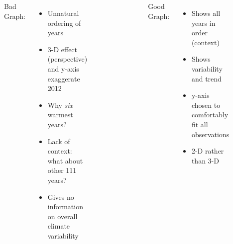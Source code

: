 \documentclass{beamer}
\begin{document}
\begin{frame}
\begin{columns}
		\begin{figure}
\end{figure}
	\footnotesize
	Bad Graph:
	\begin{itemize}
		\item Unnatural ordering of years
		\item 3-D effect (perspective) and y-axis exaggerate 2012
		\item Why \emph{six} warmest years?
		\item Lack of context: what about other 111 years?
		\item Gives no information on overall climate variability
	\end{itemize}
	
			\begin{figure}
		\small
\end{figure}
\footnotesize
Good Graph:
	\begin{itemize}
		\item Shows all years in order (context)
		\item Shows variability and trend
		\item y-axis chosen to comfortably fit all observations
		\item 2-D rather than 3-D
	\end{itemize}
	

\end{columns}
\end{frame}
\end{document}
